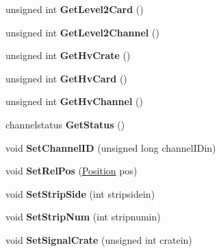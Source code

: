 \begin{DoxyCompactItemize}
\item 
\hypertarget{classChannel_a8664e03b00cfb5d9089ffc730ad2db8a}{
unsigned int {\bfseries GetLevel2Card} ()}
\label{classChannel_a8664e03b00cfb5d9089ffc730ad2db8a}

\item 
\hypertarget{classChannel_a3d15a263e8282224e6cac3e39fc537e2}{
unsigned int {\bfseries GetLevel2Channel} ()}
\label{classChannel_a3d15a263e8282224e6cac3e39fc537e2}

\item 
\hypertarget{classChannel_a976eb5f1f568d25d7e6581e947c9026a}{
unsigned int {\bfseries GetHvCrate} ()}
\label{classChannel_a976eb5f1f568d25d7e6581e947c9026a}

\item 
\hypertarget{classChannel_a77afff8e584d72b11c326d503af8cf31}{
unsigned int {\bfseries GetHvCard} ()}
\label{classChannel_a77afff8e584d72b11c326d503af8cf31}

\item 
\hypertarget{classChannel_ab0be6e53cc497a9adfd07d117bd1b8a6}{
unsigned int {\bfseries GetHvChannel} ()}
\label{classChannel_ab0be6e53cc497a9adfd07d117bd1b8a6}

\item 
\hypertarget{classChannel_a0de7daf81b2cf2931ad002365b4e83a7}{
channelstatus {\bfseries GetStatus} ()}
\label{classChannel_a0de7daf81b2cf2931ad002365b4e83a7}

\item 
\hypertarget{classChannel_abc8868d1474907bf055649280aee6ee9}{
void {\bfseries SetChannelID} (unsigned long channelIDin)}
\label{classChannel_abc8868d1474907bf055649280aee6ee9}

\item 
\hypertarget{classChannel_a1ce153da74e56914bfe92f1300d9c4db}{
void {\bfseries SetRelPos} (\hyperlink{classPosition}{Position} pos)}
\label{classChannel_a1ce153da74e56914bfe92f1300d9c4db}

\item 
\hypertarget{classChannel_a2e0a7f64af8639f223be6ae34ee1c866}{
void {\bfseries SetStripSide} (int stripsidein)}
\label{classChannel_a2e0a7f64af8639f223be6ae34ee1c866}

\item 
\hypertarget{classChannel_a1f6b1314cb1db51fd36ed6a734d46af8}{
void {\bfseries SetStripNum} (int stripnumin)}
\label{classChannel_a1f6b1314cb1db51fd36ed6a734d46af8}

\item 
\hypertarget{classChannel_ac7c8bc08322263962606adcee41e5fb9}{
void {\bfseries SetSignalCrate} (unsigned int cratein)}
\label{classChannel_ac7c8bc08322263962606adcee41e5fb9}


\end{DoxyCompactItemize}
